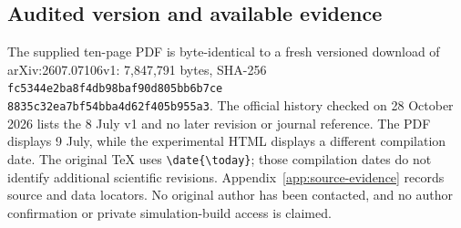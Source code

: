 \subsection{Audited version and available evidence}
The supplied ten-page PDF is byte-identical to a fresh versioned download of
arXiv:2607.07106v1: 7,847,791 bytes, SHA-256
\texttt{fc5344e2ba8f4db98baf90d805bb6b7ce}\\
\texttt{8835c32ea7bf54bba4d62f405b955a3}.
The official history checked on 28 October 2026 lists the 8 July v1 and no
later revision or journal reference. The PDF displays 9 July, while the
experimental HTML displays a different compilation date. The original TeX
uses \verb|\date{\today}|; those compilation dates do not identify additional
scientific revisions. Appendix~\ref{app:source-evidence} records source and
data locators. No original author has been contacted, and no author
confirmation or private simulation-build access is claimed.
